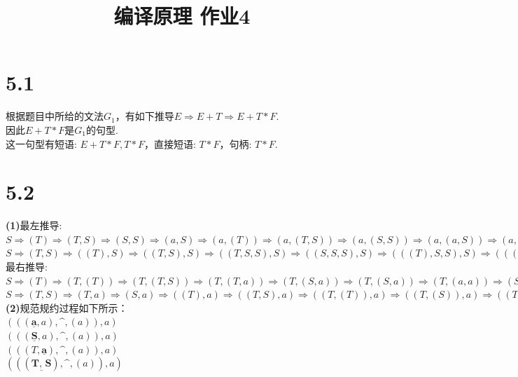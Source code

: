\documentclass{article}
\title{编译原理 作业4}
\author{}
\date{}
\begin{document}
\section*{5.1}
\noindent 
根据题目中所给的文法$G_1$，有如下推导$E\Rightarrow E+T\Rightarrow E+T*F$.\\
因此$E+T*F$是$G_1$的句型.\\
这一句型有短语: $E+T*F, T*F$，直接短语: $T*F$，句柄: $T*F$.\\
\section*{5.2}
\noindent 
\textbf{(1)}最左推导:\\
$S\Rightarrow(T)\Rightarrow(T, S)\Rightarrow(S, S)\Rightarrow(a, S)\Rightarrow(a,(T))
\Rightarrow (a, (T, S))\Rightarrow (a, (S, S))\Rightarrow (a,(a,S))\Rightarrow (a,(a,a))$\\
$S\Rightarrow (T,S)\Rightarrow ((T), S)\Rightarrow((T,S), S) \Rightarrow ((T,S,S), S)
\Rightarrow((S,S,S), S) \Rightarrow (((T), S, S), S)\Rightarrow (((T, S), S, S), S)
\Rightarrow(((S, S)S, S), S) \Rightarrow(((a, S), S, S), S) \Rightarrow(((a, a), S, S), S) 
\Rightarrow (((a, a), \^{}, S), S)\Rightarrow(((a, a), \^{} , (T)), S) 
\Rightarrow (((a, a), \^{}, (S)), S)\Rightarrow (((a, a), \^{}, (a)), S)
\Rightarrow (((a, a), \^{}, (a)), a)$\\
最右推导:\\
$S\Rightarrow(T)\Rightarrow(T, (T))\Rightarrow (T, (T, S))\Rightarrow (T, (T, a))
\Rightarrow (T, (S, a))\Rightarrow (T, (S, a))\Rightarrow (T, (a, a))\Rightarrow (S, (a, a))\Rightarrow (a,(a,a))$\\
$S\Rightarrow (T,S)\Rightarrow (T, a)\Rightarrow (S, a)\Rightarrow ((T), a)
\Rightarrow ((T, S), a)\Rightarrow ((T, (T)), a)\Rightarrow ((T, (S)), a)
\Rightarrow ((T, (a)), a)\Rightarrow ((T,S, (a)), a)\Rightarrow((T,\^{}, (a)), a)
\Rightarrow((S,\^{}, (a)), a) \Rightarrow(((T),\^{}, (a)), a)
\Rightarrow(((T, S),\^{}, (a)), a)\Rightarrow(((T, a),\^{}, (a)), a)
\Rightarrow(((S, a),\^{}, (a)), a)\Rightarrow(((a, a), \^{}, (a)), a)$\\
\textbf{(2)}规范规约过程如下所示：\\
$(((\underline{\textbf{a}},a),\^{},(a)),a)$\\
$(((\underline{\textbf{S}},a),\^{},(a)),a)$\\
$(((T,\underline{\textbf{a}}),\^{},(a)),a)$\\
$(((\underline{\textbf{T, S}}),\^{},(a)),a)$\\
\end{document}
